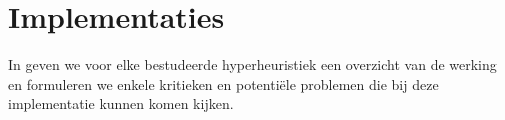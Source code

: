 \section{Implementaties}

In  geven we voor elke bestudeerde hyperheuristiek een overzicht van de werking en formuleren we enkele kritieken en potenti\"ele problemen die bij deze implementatie kunnen komen kijken.